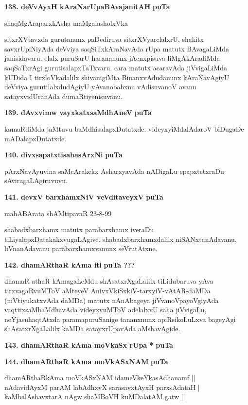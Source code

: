 \medskip
\noindent
\textbf{138. deVvAyxH kAraNarUpaBAvajanitAH} \hfill{\bf puTa \pageref{247}}

\hfill{shaqMgAraparxkAsha maMgalasholxVka}

\smallskip
sitxrXVtavxda gurutanunx paDediruva sitxrXVyarelalxrU, shakitx savxrUpiNiyAda deVviya saqSiTxkAraNavAda rUpa matutx BAvagaLiMda janisidavaru. elalx puruSarU harananunx jAcnxpisuva liMgAkAradiMda saqSaTxrAgi guru\-tisalapxTaTxvaru. cara matutx acaravAda jiVvigaLiMda kUDida I tirxloVkadalilx shivanigiMta BinanxvAdu\-danunx kAraNavAgiyU deVviya gurutilalxdudAgiyU yAvanobabxnu vAdisuvanoV avanu satayx\-vidUra\-nAda dumaRtiyenisuvanu.

\medskip
\noindent
\textbf{139. dAvxvimw vayxkatxsaMdhAneV} \hfill{\bf puTa \pageref{86}}

\smallskip
kamaRdiMda jaMtuvu baMdhisalapxDutatxde. videyxyiMdalAdaroV biDugaDe mADalapxDutatxde.

\medskip
\noindent
\textbf{140. divxsapatxtisahasArxNi} \hfill{\bf puTa \pageref{155}}

\smallskip
pArxNavAyuvina saMcArakekx AsharxyavAda nADigaLu epapxtetxraDu sAvira\-gaLAgiruvuvu.

\eject

\noindent
\textbf{141. devxV barxhamxNiV veVditaveyxV} \hfill{\bf puTa \pageref{149}}

\hfill{mahABArata shAMtipavaR 23-8-99}

\smallskip
shabadxbarxhamx matutx parabarxhamx iveraDu tiLiyalapxDatakakxvugaLAgive. shabadxbarxhamxdalilx niSANxtanAdavanu, liVna\-nAdavanu parabarxhamxvanunx seVrutAtxne.


\medskip
\noindent
\textbf{142. dhamARthaR kAma iti} \hfill{\bf puTa ???}

\smallskip
dhamaR athaR kAmagaLeMdu shAsatxrXgaLalilx tiLidubaruva yAva tirxvagaR\-vuMToV aMteyeV AnivxVkiSxkiV\--tarxyiV-vAtAR-daMDa (niVtiyukatxvAda daMDa) matutx nAnA\-bageya jiVvanoVpayoVgiyAda vaqtitx\-saMbaMdhavAda videyxyuMToV adelalxvU saha jiVvigaLu, neYjasuhaqtAtxda paramapuruSanige tananxnunx apiRsi\-koLuLxva bage\-yAgi shAsatxrXgaLalilx kaMDa satayxrUpavAda aMshavAgide.

\medskip
\noindent
\textbf{143. dhamARthaR kAma moVkaSx rUpa *} \hfill{\bf puTa \pageref{94}}

\medskip
\noindent
\textbf{144. dhamARthaR kAma moVkASxNAM} \hfill{\bf puTa \pageref{159}}

\begin{shloka}
dhamARthaRkAma moVkASxNAM idameVkeYkasAdhanamf ||\\
nAdavidAyxM parAM labAdhxvX sarasavxtAyxH parxsAdataH |\\
kaMbalAshavxtarA nAgw shaMBoVH kuMDalatAM gatw ||
\end{shloka}

